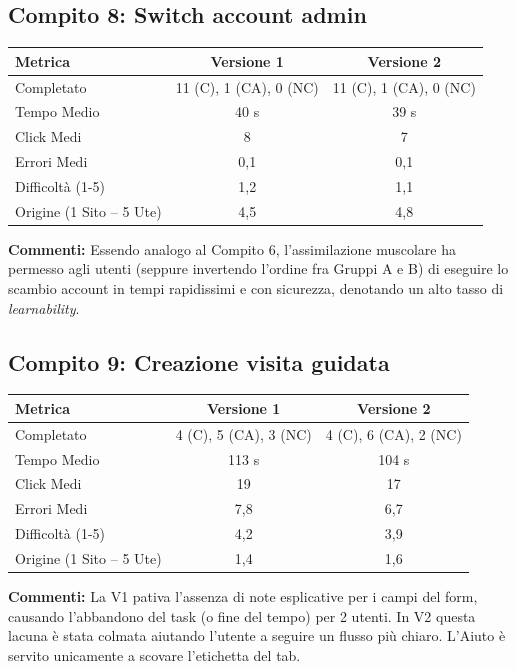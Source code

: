 \subsection{Compito 8: Switch account admin}
\begin{table}[H]
\centering
\renewcommand{\arraystretch}{1.2}
\small
\begin{tabular}{|l|c|c|}
\hline
\textbf{Metrica} & \textbf{Versione 1} & \textbf{Versione 2} \\
\hline
Completato & 11 (C), 1 (CA), 0 (NC) & 11 (C), 1 (CA), 0 (NC) \\ \hline
Tempo Medio & 40 s & 39 s \\ \hline
Click Medi & 8 & 7 \\ \hline
Errori Medi & 0,1 & 0,1 \\ \hline
Difficoltà (1-5) & 1,2 & 1,1 \\ \hline
Origine (1 Sito -- 5 Ute) & 4,5 & 4,8 \\ \hline
\end{tabular}
\end{table}
\textbf{Commenti:} Essendo analogo al Compito 6, l'assimilazione muscolare ha permesso agli utenti (seppure invertendo l'ordine fra Gruppi A e B) di eseguire lo scambio account in tempi rapidissimi e con sicurezza, denotando un alto tasso di \textit{learnability}.

\subsection{Compito 9: Creazione visita guidata}
\begin{table}[H]
\centering
\renewcommand{\arraystretch}{1.2}
\small
\begin{tabular}{|l|c|c|}
\hline
\textbf{Metrica} & \textbf{Versione 1} & \textbf{Versione 2} \\
\hline
Completato & 4 (C), 5 (CA), 3 (NC) & 4 (C), 6 (CA), 2 (NC) \\ \hline
Tempo Medio & 113 s & 104 s \\ \hline
Click Medi & 19 & 17 \\ \hline
Errori Medi & 7,8 & 6,7 \\ \hline
Difficoltà (1-5) & 4,2 & 3,9 \\ \hline
Origine (1 Sito -- 5 Ute) & 1,4 & 1,6 \\ \hline
\end{tabular}
\end{table}
\textbf{Commenti:} La V1 pativa l'assenza di note esplicative per i campi del form, causando l'abbandono del task (o fine del tempo) per 2 utenti. In V2 questa lacuna è stata colmata aiutando l'utente a seguire un flusso più chiaro. L'Aiuto è servito unicamente a scovare l'etichetta del tab.


